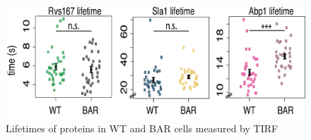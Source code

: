 \begin{figure}[H]
	\vspace{4cm}
	\includegraphics[scale=0.5]{figures/appendix/delsh3_5}
	\caption{     Lifetimes of proteins in WT and BAR cells measured by TIRF}
\end{figure}